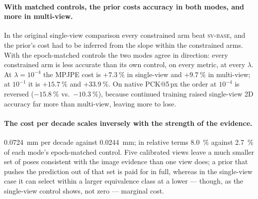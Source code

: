 \documentclass[11pt,a4paper]{article}
\newcommand{\lam}{\lambda}
\newcommand{\svbase}{\textsc{sv-base}}
\begin{document}
\paragraph{With matched controls, the prior costs accuracy in both modes, and
more in multi-view.}
In the original single-view comparison every constrained arm beat \svbase{},
and the prior's cost had to be inferred from the slope within the constrained
arms. With the epoch-matched controls the two modes agree in direction: every
constrained arm is less accurate than its own control, on every metric, at
every $\lam$. At $\lam = 10^{-4}$ the MPJPE cost is $+\SI{7.3}{\percent}$ in
single-view and $+\SI{9.7}{\percent}$ in multi-view; at $10^{-1}$ it is
$+\SI{15.7}{\percent}$ and $+\SI{33.9}{\percent}$. On native PCK@5\,px the
order at $10^{-4}$ is reversed ($-\SI{15.8}{\percent}$ vs.\
$-\SI{10.3}{\percent}$), because continued training raised single-view 2D
accuracy far more than multi-view, leaving more to lose.

\paragraph{The cost per decade scales inversely with the strength of the
evidence.}
\SI{0.0724}{\milli\metre} per decade against \SI{0.0244}{\milli\metre}; in
relative terms \SI{8.0}{\percent} against \SI{2.7}{\percent} of each mode's
epoch-matched control. Five calibrated views leave a much smaller set of poses
consistent with the image evidence than one view does; a prior that pushes the
prediction out of that set is paid for in full, whereas in the single-view case
it can select within a larger equivalence class at a lower --- though, as the
single-view control shows, not zero --- marginal cost.
\end{document}
